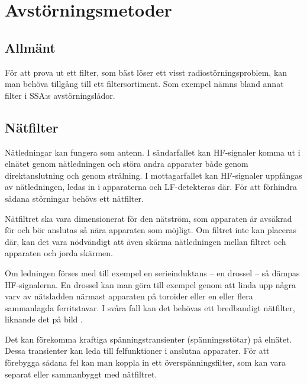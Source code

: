 \section{Avstörningsmetoder}
\label{avstörning}


\subsection{Allmänt}
För att prova ut ett filter, som bäst löser ett visst radiostörningsproblem,
kan man behöva tillgång till ett filtersortiment.
Som exempel nämns bland annat filter i SSA:s avstörningslådor.

\subsection{Nätfilter}

Nätledningar kan fungera som antenn.
I sändarfallet kan HF-signaler komma ut i elnätet genom nätledningen och störa
andra apparater både genom direktanslutning och genom strålning.
I mottagarfallet kan HF-signaler uppfångas av nätledningen, ledas in i
apparaterna och LF-detekteras där.
För att förhindra sådana störningar behövs ett nätfilter.

Nätfiltret ska vara dimensionerat för den nätström, som apparaten är avsäkrad
för och bör anslutas så nära apparaten som möjligt.
Om filtret inte kan placeras där, kan det vara nödvändigt att även skärma
nätledningen mellan filtret och apparaten och jorda skärmen.


Om ledningen förses med till exempel en serieinduktans -- en drossel -- så
dämpas HF-signalerna.
En drossel kan man göra till exempel genom att linda upp några varv av nätsladden
närmast apparaten på toroider eller en eller flera sammanlagda ferritstavar.
I svåra fall kan det behövas ett bredbandigt nätfilter, liknande
det på bild .

Det kan förekomma kraftiga spänningstransienter (spänningsstötar) på elnätet.
Dessa transienter kan leda till felfunktioner i anslutna apparater.
För att förebygga sådana fel kan man koppla in ett överspänningsfilter, som kan
vara separat eller sammanbyggt med nätfiltret.

